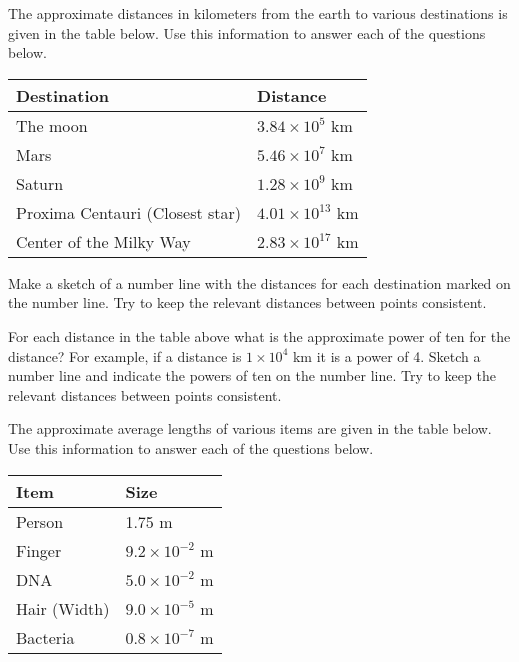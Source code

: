 \begin{problem}
\item The approximate distances in kilometers from the earth to
  various destinations is given in the table below. Use this
  information to answer each of the questions below.

  \begin{tabular}{ll}
    Destination & Distance \\ \hline
    The moon & $3.84 \times 10^5$ km \\
    Mars &  $5.46 \times 10^7$ km \\
    Saturn & $1.28 \times 10^9$ km \\
    Proxima Centauri (Closest star) & $4.01 \times 10^{13}$ km \\
    Center of the Milky Way & $2.83 \times 10^{17}$ km
  \end{tabular}

  \begin{subproblem}
  \item Make a sketch of a number line with the distances for each
    destination marked on the number line.  Try to keep the relevant
    distances between points consistent.

    \vfill
    
  \item For each distance in the table above what is the approximate
    power of ten for the distance? For example, if a distance is
    $1\times 10^4$ km it is a power of 4. Sketch a number line and
    indicate the powers of ten on the number line. Try to keep the
    relevant distances between points consistent.
      
    \vfill
  \end{subproblem}

\clearpage

The approximate average lengths of various items are given in the table
below. Use this information to answer each of the questions below.

  \begin{tabular}{ll}
    Item & Size \\ \hline
    Person & 1.75 m \\
    Finger & $9.2 \times 10^{-2}$ m\\
    DNA & $ 5.0 \times 10^{-2}$ m \\
    Hair (Width) & $ 9.0\times 10^{-5}$ m \\
    Bacteria & $ 0.8 \times 10^{-7}$ m\\
  \end{tabular}


\end{problem}
